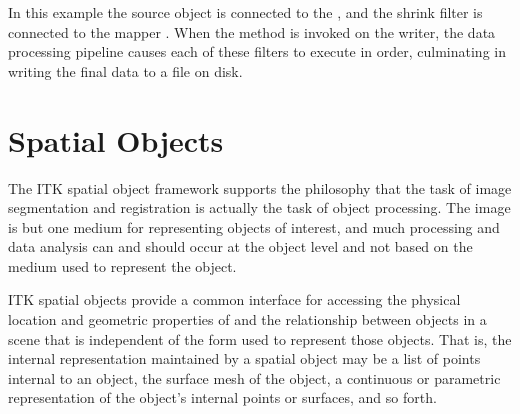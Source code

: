 In this example the source object  is connected
to the , and the shrink filter is connected to
the mapper . When the  method is
invoked on the writer, the data processing pipeline causes each of these
filters to execute in order, culminating in writing the final data to a file on disk.


\section{Spatial Objects}
\label{sec:SpatialObjectsOverview}

The ITK spatial object framework supports the philosophy that the task of
image segmentation and registration is actually the task of object
processing. The image is but one medium for representing objects of interest,
and much processing and data analysis can and should occur at the object
level and not based on the medium used to represent the object.

ITK spatial objects provide a common interface for accessing the physical
location and geometric properties of and the relationship between objects in
a scene that is independent of the form used to represent those objects. That
is, the internal representation maintained by a spatial object may be a list
of points internal to an object, the surface mesh of the object, a continuous
or parametric representation of the object's internal points or surfaces, and
so forth.


